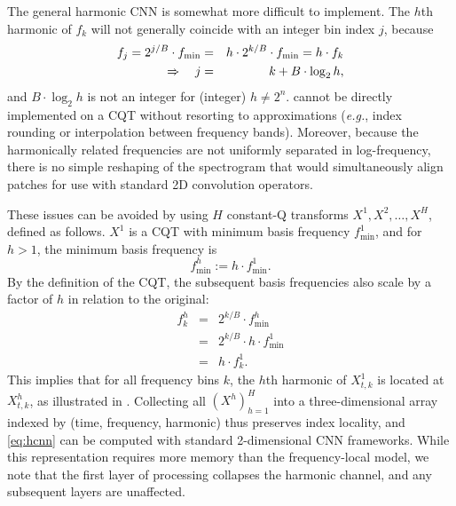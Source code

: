 \documentclass{article}
\def\eg{\emph{e.g.}}
\begin{document}
The general harmonic CNN is somewhat more difficult to implement.
The $h$th harmonic of $f_k$ will not generally coincide with an integer bin index $j$, because
\begin{eqnarray}
    f_j = 2^{j/B} \cdot f_{\min} &=& h \cdot 2^{k/B}\cdot f_{\min} = h \cdot f_k \notag \\
\Rightarrow \quad j &=& k + B \cdot \log_2 h,
\end{eqnarray}
and $B \cdot\log_2 h$ is not an integer for (integer) $h \neq 2^n$.
 cannot be directly implemented on a CQT without resorting to approximations (\eg, index rounding or interpolation between frequency bands).
Moreover, because the harmonically related frequencies are not uniformly separated in log-frequency, there is no simple reshaping of the spectrogram that would simultaneously align patches for use with standard 2D convolution operators.

These issues can be avoided by using $H$ constant-Q transforms $X^1, X^2, \dots, X^H$, defined as follows.
$X^1$ is a CQT with minimum basis frequency $f^1_{\min}$,
and for $h > 1$, the minimum basis frequency is
\begin{equation}
    f^h_{\min} := h \cdot f^1_{\min}.\label{eq:fmin}
\end{equation}
By the definition of the CQT, the subsequent basis frequencies also scale by a factor of $h$ in relation to the original:
\begin{eqnarray}
    f^h_k &=& 2^{k/B} \cdot f^h_{\min}\\
        &=& 2^{k/B} \cdot h \cdot f^1_{\min}\\
    &=& h \cdot f^1_k.
\end{eqnarray}
This implies that for all frequency bins $k$, the $h$th harmonic of $X^1_{t, k}$ is located at $X^h_{t, k}$, as illustrated in .
Collecting all ${(X^h)}_{h=1}^H$ into a three-dimensional array indexed by (time, frequency, harmonic) thus preserves index locality, and \cref{eq:hcnn} can be computed with standard 2-dimensional CNN frameworks.
While this representation requires more memory than the frequency-local model, we note that the first layer of processing collapses the harmonic channel, and any subsequent layers are unaffected.
\end{document}
